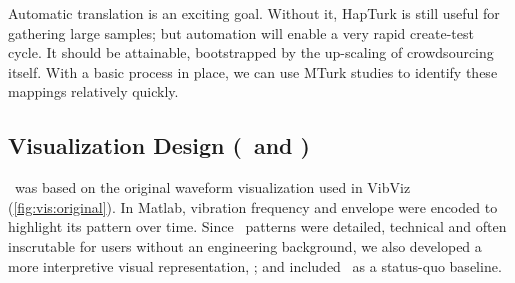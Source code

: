 Automatic translation is an exciting goal. Without it, HapTurk is still useful for gathering large samples; but automation will enable a very rapid create-test cycle. 
It should be attainable, bootstrapped by the up-scaling of crowdsourcing itself. With a  basic process in place, we can use MTurk studies to identify these mappings relatively quickly.

\vspace{0.25in}

\subsection{Visualization Design (\original\ and \linear)}

    \original\ was based on the original waveform visualization used in VibViz  (\autoref{fig:vis:original}).
    In Matlab, vibration frequency and envelope were encoded to highlight its pattern over time.
    Since \original\ patterns were detailed, technical and often inscrutable for users without an engineering background, we also developed a more interpretive visual representation,  \linear; and 
    included \original\ as a status-quo baseline.

    
    
    
  

